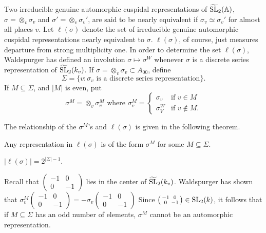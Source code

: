 Two irreducible genuine automorphic cuspidal representations of $\widetilde{\mathrm{SL}}_2(\mathbb{A})$, $\sigma = \otimes_v \sigma_v$ and $\sigma' = \otimes_v \sigma_{v}'$, are said to be nearly equivalent if $\sigma_v \simeq \sigma_v'$ for almost all places $v$.
Let $\ell(\sigma)$ denote the set of irreducible genuine automorphic cuspidal representations nearly equivalent to $\sigma$.
$\ell(\sigma)$, of course, just measures departure from strong multiplicity one.
In order to determine the set $\ell(\sigma)$, Waldspurger
has defined an involution $\sigma \mapsto \sigma^W$ whenever $\sigma$ is a discrete series representation of $\widetilde{\mathrm{SL}}_2(k_v)$.
If $\sigma = \otimes_v \sigma_v \subset A_{00}$, define
\[
\Sigma = \{ v: \sigma_v\text{ is a discrete series representation}\}.
\]
If $M \subseteq \Sigma$, and $|M|$ is even, put
\[
\sigma^M = \otimes_v \sigma_v^M \text{ where } \sigma_v^M = \begin{cases} \sigma_v & \text{if }v\in M \\ \sigma_V^W & \text{if }v \not\in M.\end{cases}
\]

The relationship of the $\sigma^M$'s and $\ell(\sigma)$ is given in the following theorem.

\begin{theorem}
\label{thm:1.3}
Any representation in $\ell(\sigma)$ is of the form $\sigma^M$ for some $M \subseteq \Sigma$.
\end{theorem}

\begin{corollary}
$|\ell(\sigma)| = 2^{|\Sigma| - 1}$.
\end{corollary}

\begin{remark*}
Recall that $\left(\begin{smallmatrix}
    -1 & 0 \\ 0 & -1
\end{smallmatrix}\right)$ lies in the center of $\widetilde{\mathrm{SL}}_2(k_v)$.
Waldspurger has shown that $\sigma_v^M\left(\begin{smallmatrix}
    -1 & 0 \\ 0 & -1
\end{smallmatrix}\right) = - \sigma_v\left(\begin{smallmatrix}
    -1 & 0 \\ 0 & -1
\end{smallmatrix}\right)$
Since $\left(\begin{smallmatrix}
    -1 & 0 \\ 0 & -1
\end{smallmatrix}\right) \in \mathrm{SL}_2(k)$, it follows that if $M \subseteq \Sigma$ has an odd number of elements, $\sigma^M$ cannot be an automorphic representation.
\end{remark*}
